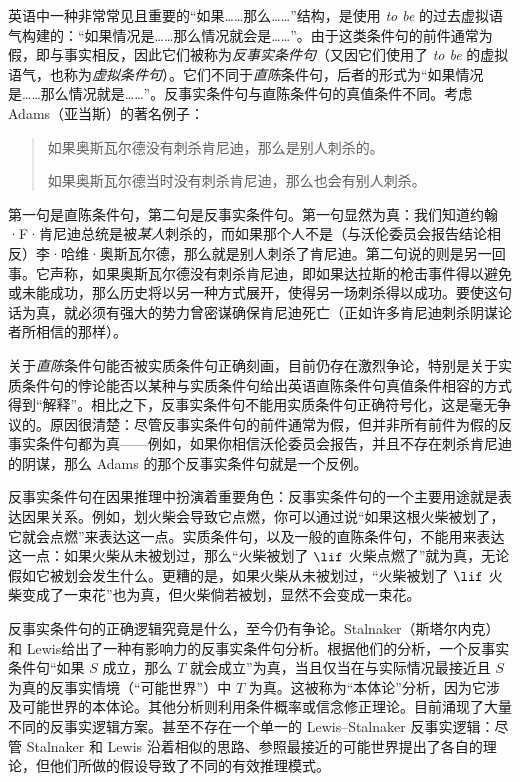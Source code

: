 \documentclass[../../../include/open-logic-section]{subfiles}
\begin{document}


英语中一种非常常见且重要的“如果……那么……”结构，是使用 \emph{to be} 的过去虚拟语气构建的：“如果情况是……那么情况就会是……”。由于这类条件句的前件通常为假，即与事实相反，因此它们被称为\emph{反事实条件句}（又因它们使用了 \emph{to be} 的虚拟语气，也称为\emph{虚拟条件句}）。它们不同于\emph{直陈}条件句，后者的形式为“如果情况是……那么情况就是……”。反事实条件句与直陈条件句的真值条件不同。考虑 Adams（亚当斯）的著名例子：

\begin{quote}
  如果奥斯瓦尔德没有刺杀肯尼迪，那么是别人刺杀的。

  如果奥斯瓦尔德当时没有刺杀肯尼迪，那么也会有别人刺杀。
\end{quote}

第一句是直陈条件句，第二句是反事实条件句。第一句显然为真：我们知道约翰·F·肯尼迪总统是被\emph{某人}刺杀的，而如果那个人不是（与沃伦委员会报告结论相反）李·哈维·奥斯瓦尔德，那么就是别人刺杀了肯尼迪。第二句说的则是另一回事。它声称，如果奥斯瓦尔德没有刺杀肯尼迪，即如果达拉斯的枪击事件得以避免或未能成功，那么历史将以另一种方式展开，使得另一场刺杀得以成功。要使这句话为真，就必须有强大的势力曾密谋确保肯尼迪死亡（正如许多肯尼迪刺杀阴谋论者所相信的那样）。

关于\emph{直陈}条件句能否被实质条件句正确刻画，目前仍存在激烈争论，特别是关于实质条件句的悖论能否以某种与实质条件句给出英语直陈条件句真值条件相容的方式得到“解释”。相比之下，反事实条件句不能用实质条件句正确符号化，这是毫无争议的。原因很清楚：尽管反事实条件句的前件通常为假，但并非所有前件为假的反事实条件句都为真——例如，如果你相信沃伦委员会报告，并且不存在刺杀肯尼迪的阴谋，那么 Adams 的那个反事实条件句就是一个反例。

反事实条件句在因果推理中扮演着重要角色：反事实条件句的一个主要用途就是表达因果关系。例如，划火柴会导致它点燃，你可以通过说“如果这根火柴被划了，它就会点燃”来表达这一点。实质条件句，以及一般的直陈条件句，不能用来表达这一点：如果火柴从未被划过，那么“火柴被划了 $\lif$ 火柴点燃了”就为真，无论假如它被划会发生什么。更糟的是，如果火柴从未被划过，“火柴被划了 $\lif$ 火柴变成了一束花”也为真，但火柴倘若被划，显然不会变成一束花。

反事实条件句的正确逻辑究竟是什么，至今仍有争论。Stalnaker（斯塔尔内克）和 Lewis给出了一种有影响力的反事实条件句分析。根据他们的分析，一个反事实条件句“如果 $S$ 成立，那么 $T$ 就会成立”为真，当且仅当在与实际情况最接近且 $S$ 为真的反事实情境（“可能世界”）中 $T$ 为真。这被称为“本体论”分析，因为它涉及可能世界的本体论。其他分析则利用条件概率或信念修正理论。目前涌现了大量不同的反事实逻辑方案。甚至不存在一个单一的 Lewis–Stalnaker 反事实逻辑：尽管 Stalnaker 和 Lewis 沿着相似的思路、参照最接近的可能世界提出了各自的理论，但他们所做的假设导致了不同的有效推理模式。
\end{document}
